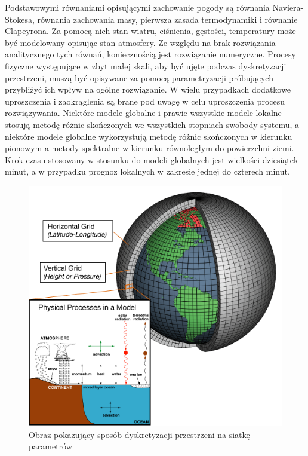 Podstawowymi równaniami opisującymi zachowanie pogody są równania Naviera-Stokesa, równania zachowania
masy, pierwsza zasada termodynamiki i równanie Clapeyrona. Za pomocą nich stan wiatru, ciśnienia,
gęstości, temperatury może być modelowany opisując stan atmosfery. Ze względu na brak rozwiązania
analitycznego tych równań, koniecznością jest rozwiązanie numeryczne. Procesy fizyczne występujące
w zbyt małej skali, aby być ujęte podczas dyskretyzacji przestrzeni, muszą być opisywane za pomocą
parametryzacji próbujących przybliżyć ich wpływ na ogólne rozwiązanie. W wielu przypadkach 
dodatkowe uproszczenia i zaokrąglenia są brane pod uwagę w celu uproszczenia procesu
rozwiązywania. Niektóre modele globalne i prawie wszystkie modele lokalne stosują 
metodę różnic skończonych we wszystkich stopniach swobody systemu, a niektóre modele globalne
wykorzystują metodę różnic skończonych w kierunku pionowym a metody spektralne w kierunku równoległym
do powierzchni ziemi. Krok czasu stosowany w stosunku do modeli globalnych jest wielkości dziesiątek
minut, a w przypadku prognoz lokalnych w zakresie jednej do czterech minut.

\begin{figure}[H]
    \centering
    \includegraphics[width=\textwidth]{images/grid.png}
    \caption[opis dla siatki]{Obraz pokazujący sposób dyskretyzacji przestrzeni
    na siatkę parametrów\footnotemark}
    \label{grid}
\end{figure}

